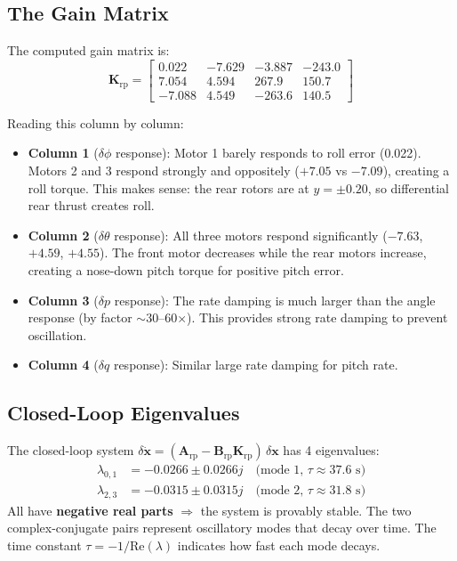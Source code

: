 \documentclass[12pt, a4paper]{article}
\newcommand{\bx}{\bm{x}}
\newcommand{\bK}{\bm{K}}
\newcommand{\bA}{\bm{A}}
\newcommand{\bB}{\bm{B}}
\begin{document}
\subsection{The Gain Matrix}

The computed gain matrix is:
\begin{equation}
    \bK_{\text{rp}} = \begin{bmatrix}
        0.022 & -7.629 & -3.887 & -243.0 \\
        7.054 & 4.594 & 267.9 & 150.7 \\
        -7.088 & 4.549 & -263.6 & 140.5
    \end{bmatrix}
\end{equation}

Reading this column by column:
\begin{itemize}
    \item \textbf{Column 1} ($\delta\phi$ response): Motor 1 barely responds to roll error (0.022).  Motors 2 and 3 respond strongly and oppositely ($+7.05$ vs $-7.09$), creating a roll torque.  This makes sense: the rear rotors are at $y = \pm 0.20$, so differential rear thrust creates roll.

    \item \textbf{Column 2} ($\delta\theta$ response): All three motors respond significantly ($-7.63$, $+4.59$, $+4.55$).  The front motor decreases while the rear motors increase, creating a nose-down pitch torque for positive pitch error.

    \item \textbf{Column 3} ($\delta p$ response): The rate damping is much larger than the angle response (by factor $\sim 30$--60$\times$).  This provides strong rate damping to prevent oscillation.

    \item \textbf{Column 4} ($\delta q$ response): Similar large rate damping for pitch rate.
\end{itemize}

\subsection{Closed-Loop Eigenvalues}

The closed-loop system $\delta \dot{\bx} = (\bA_{\text{rp}} - \bB_{\text{rp}}\bK_{\text{rp}}) \, \delta\bx$ has 4 eigenvalues:
\begin{align}
    \lambda_{0,1} &= -0.0266 \pm 0.0266j \quad \text{(mode 1, } \tau \approx 37.6 \text{ s)} \\
    \lambda_{2,3} &= -0.0315 \pm 0.0315j \quad \text{(mode 2, } \tau \approx 31.8 \text{ s)}
\end{align}
All have \textbf{negative real parts} $\Rightarrow$ the system is provably stable.  The two complex-conjugate pairs represent oscillatory modes that decay over time.  The time constant $\tau = -1/\text{Re}(\lambda)$ indicates how fast each mode decays.
\end{document}
